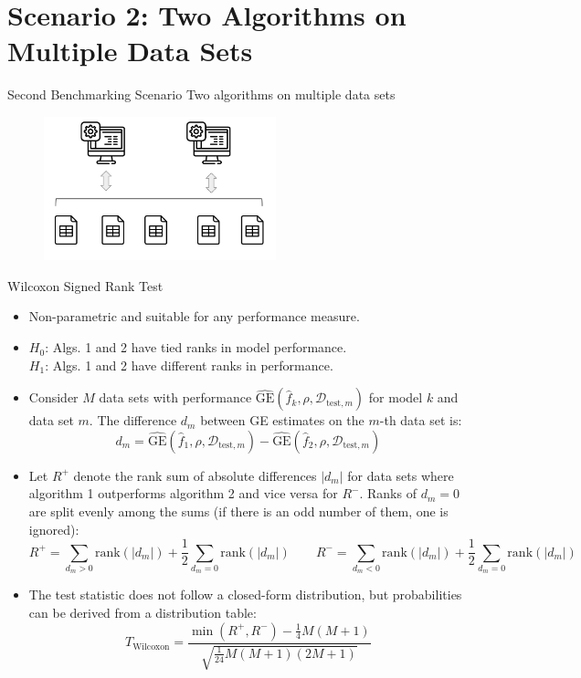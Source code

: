 \documentclass[11pt,compress,t,notes=noshow, xcolor=table]{beamer}
\newcommand{\Dtestm}{\mathcal{D}_{\text{test}, m}}
\begin{document}
\section{Scenario 2: Two Algorithms on Multiple Data Sets}
\begin{frame}{Second Benchmarking Scenario}
\vfill
\centering
\large{Two algorithms on multiple data sets}
    \begin{figure}
        \includegraphics[width = 0.6\textwidth]{figure/2algos_multipledatasets.png}
    \end{figure}
\vfill
\end{frame}

\begin{frame}{Wilcoxon Signed Rank Test}
    \begin{itemize}
        \item Non-parametric and suitable for any performance measure.
        \item $H_0$: Algs. 1 and 2 have tied ranks in model performance. \\
        $H_1$: Algs. 1 and 2 have different ranks in performance.
        \item Consider $M$ data sets with performance $\widehat{\text{GE}}(\widehat{f}_k, \rho, \Dtestm)$ for model $k$ and data set $m$. The difference $d_m$ between GE estimates on the $m$-th data set is:
        $$
        d_m = \widehat{\text{GE}}(\widehat{f}_1, \rho, \Dtestm) - \widehat{\text{GE}}(\widehat{f}_2, \rho, \Dtestm)
        $$
        \item Let $R^{+}$ denote the rank sum of absolute differences $|d_m|$ for data sets where algorithm 1 outperforms algorithm 2 and vice versa for $R^{-}$. Ranks of $d_m = 0$ are split evenly among the sums (if there is an odd number of them, one is ignored):
        $$
        R^{+} = \sum_{d_m > 0} \text{rank}(|d_m|) + \frac{1}{2} \sum_{d_m = 0} \text{rank}(|d_m|) \quad\quad R^{-} = \sum_{d_m < 0} \text{rank}(|d_m|) + \frac{1}{2} \sum_{d_m = 0} \text{rank}(|d_m|)
        $$
        \item The test statistic does not follow a closed-form distribution, but probabilities can be derived from a distribution table:
        $$
        T_{\text{Wilcoxon}} = \frac{\min(R^{+}, R^{-})   - \frac{1}{4}M(M + 1)}{\sqrt{\frac{1}{24}M(M + 1)(2M + 1)}}
        $$
    \end{itemize}
\end{frame}
\end{document}
